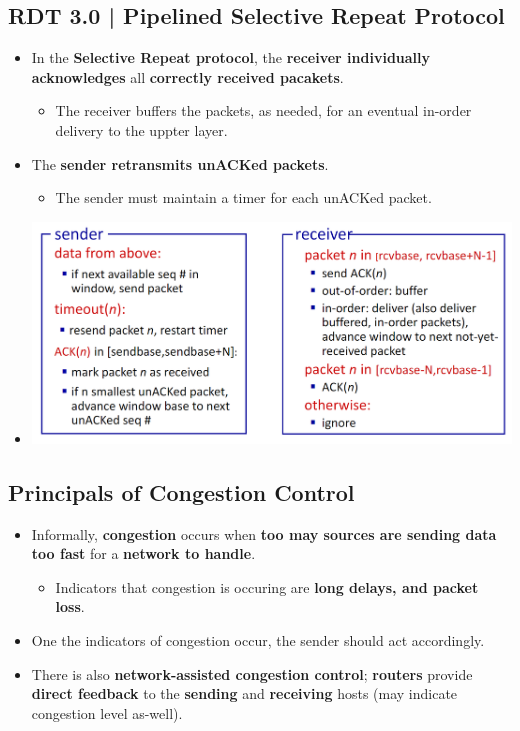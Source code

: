 \documentclass[16pt]{article}
\begin{document}
    \subsection*{RDT 3.0 | Pipelined Selective Repeat Protocol}
    \begin{itemize}
        \item In the \textbf{Selective Repeat protocol}, the \textbf{receiver individually acknowledges} all \textbf{correctly received pacakets}.
        \begin{itemize}
            \item The receiver buffers the packets, as needed, for an eventual in-order delivery to the uppter layer.
        \end{itemize}
        \item The \textbf{sender retransmits unACKed packets}.
        \begin{itemize}
            \item The sender must maintain a timer for each unACKed packet.
        \end{itemize}
        \item[] \includegraphics*[width=\textwidth - 25pt]{images/Selective-Repeat-Protocol.PNG}
    \end{itemize}

    \subsection*{Principals of Congestion Control}
    \begin{itemize}
        \item Informally, \textbf{congestion} occurs when \textbf{too may sources are sending data too fast} for a \textbf{network to handle}.
        \begin{itemize}
            \item Indicators that congestion is occuring are \textbf{long delays, and packet loss}.
        \end{itemize}
        \item One the indicators of congestion occur, the sender should act accordingly.
        \item There is also \textbf{network-assisted congestion control}; \textbf{routers} provide \textbf{direct feedback} to the \textbf{sending} and \textbf{receiving} hosts (may indicate congestion level as-well).
    \end{itemize}
\end{document}
